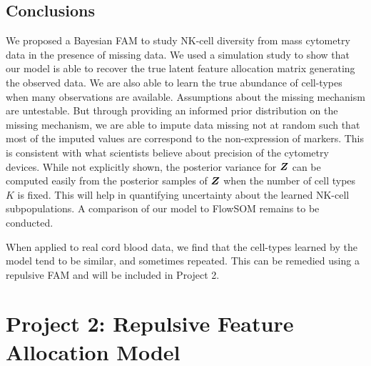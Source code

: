 \documentclass[12pt,]{article}
\newcommand{\bZ}{\mbox{\boldmath $Z$}}
\begin{document}
\subsection{Conclusions}\label{sec:CB-conc}


We proposed a Bayesian FAM to study NK-cell
diversity from mass cytometry data in the presence of missing data. We used a
simulation study to show that our model is able to recover the true latent
feature allocation matrix generating the observed data. We are also able to
learn the true abundance of cell-types when many observations are available. 
%
Assumptions about the missing mechanism are untestable. But through providing
an informed prior distribution on the missing mechanism, we are able to impute
data missing not at random such that most of the imputed values are correspond
to the non-expression of markers. This is consistent with what scientists
believe about precision of the cytometry devices.
%
While not explicitly shown, the posterior variance for $\bZ$ can be computed
easily from the posterior samples of $\bZ$ when the number of cell types $K$ is fixed. This will help in
quantifying uncertainty about the learned NK-cell subpopulations. 
%
A comparison of our model to FlowSOM remains to be conducted. 
%

When applied to real cord blood data, we find that the cell-types learned by
the model tend to be similar, and sometimes repeated. This can be remedied
using a repulsive FAM and will be included in Project 2. %





\section{Project 2: Repulsive Feature Allocation Model}\label{sec:proj2}
\end{document}
